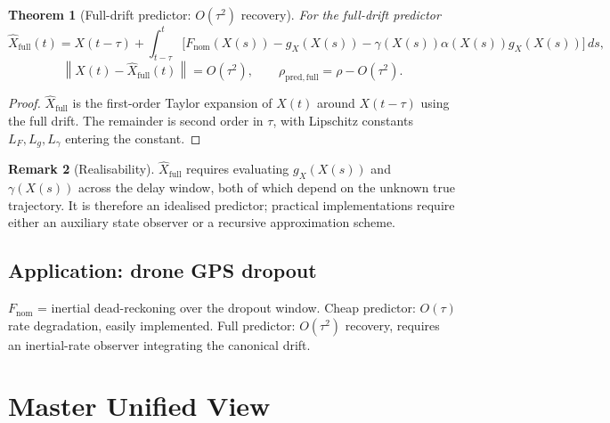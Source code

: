\documentclass[11pt,a4paper]{article}
\newtheorem{theorem}{Theorem}[section]
\theoremstyle{definition}
\newtheorem{remark}[theorem]{Remark}
\newcommand{\norm}[1]{\left\|#1\right\|}
\newcommand{\nom}{\mathrm{nom}}
\begin{document}
\begin{theorem}[Full-drift predictor: $O(\tau^2)$ recovery]
\label{thm:md3prime}
For the full-drift predictor
\[
\hat X_{\mathrm{full}}(t) = X(t-\tau) + \int_{t-\tau}^t \!\!\Big[F_\nom(X(s)) - g_X(X(s)) - \gamma(X(s))\alpha(X(s)) g_X(X(s))\Big]\,ds,
\]
\[
\norm{X(t) - \hat X_{\mathrm{full}}(t)} = O(\tau^2),
\qquad
\rho_{\mathrm{pred,full}} = \rho - O(\tau^2).
\]
\end{theorem}

\begin{proof}
$\hat X_{\mathrm{full}}$ is the first-order Taylor expansion of $X(t)$ around $X(t-\tau)$ using the full drift. The remainder is second order in $\tau$, with Lipschitz constants $L_F, L_g, L_\gamma$ entering the constant.
\end{proof}

\begin{remark}[Realisability]
$\hat X_{\mathrm{full}}$ requires evaluating $g_X(X(s))$ and $\gamma(X(s))$ across the delay window, both of which depend on the unknown true trajectory. It is therefore an idealised predictor; practical implementations require either an auxiliary state observer or a recursive approximation scheme.
\end{remark}

\subsection{Application: drone GPS dropout}

$F_\nom$ = inertial dead-reckoning over the dropout window. Cheap predictor: $O(\tau)$ rate degradation, easily implemented. Full predictor: $O(\tau^2)$ recovery, requires an inertial-rate observer integrating the canonical drift.

\newpage

\section{Master Unified View}
\end{document}
